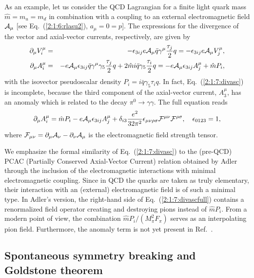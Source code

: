 \documentclass[twoside,12pt]{article}
\begin{document}
   As an example, let us consider the QCD Lagrangian for a finite light quark
mass $\hat{m}=m_u=m_d$ in combination with a coupling to an external
electromagnetic field ${\cal A}_\mu$ [see Eq.\ (\ref{2:1:6:rlasu2}),
$a_\mu=0=p$].
   The expressions for the divergence of the vector and
axial-vector currents, respectively, are given by \cite{Fuchs:2003vw}
\begin{eqnarray}
\label{2:1:7:divvsc}
\partial_\mu V^\mu_i&=&-\epsilon_{3ij}e{\cal A}_\mu \bar{q}\gamma^\mu
\frac{\tau_j}{2}q=-\epsilon_{3ij}e{\cal A}_\mu V^\mu_j,\\
\label{2:1:7:divasc}
\partial_\mu A^\mu_i
&=&-e {\cal A}_\mu \epsilon_{3ij} \bar{q}\gamma^\mu
\gamma_5 \frac{\tau_j}{2} q+2\hat m i\bar{q}\gamma_5 \frac{\tau_i}{2}q
=-e {\cal A}_\mu \epsilon_{3ij} A^\mu_j+\hat m P_i,
\end{eqnarray}
with the isovector pseudoscalar density
$P_i=i\bar{q}\gamma_5 \tau_i q$.
   In fact, Eq.\ (\ref{2:1:7:divasc}) is incomplete, because the third
component of the axial-vector current, $A^\mu_3$, has an anomaly
which is related to the decay $\pi^0\to\gamma\gamma$.
   The full equation reads
\begin{equation}
\label{2:1:7:divascfull}
\partial_\mu A^\mu_i
=\hat m P_i-e {\cal A}_\mu \epsilon_{3ij} A^\mu_j
+\delta_{i3}
\frac{e^2}{32\pi^2}\epsilon_{\mu\nu\rho\sigma}{\cal F}^{\mu\nu}
{\cal F}^{\rho\sigma}, \quad \epsilon_{0123}=1,
\end{equation}
where ${\cal F}_{\mu\nu}=\partial_\mu{\cal A}_\nu-\partial_\nu{\cal A}_\mu$ is
the electromagnetic field strength tensor.

   We emphasize the formal similarity of Eq.\ (\ref{2:1:7:divasc}) to the
(pre-QCD) PCAC (Partially Conserved Axial-Vector Current) relation
obtained by Adler \cite{Adler:1965:5:5} through the inclusion of the
electromagnetic interactions with minimal electromagnetic coupling.
  Since in QCD the quarks are taken as truly elementary, their interaction
with an (external) electromagnetic field is of such a minimal type.
   In Adler's version, the right-hand side of Eq.\ (\ref{2:1:7:divascfull})
contains a renormalized field operator creating and destroying pions instead of
$\hat m P_i$.
   From a modern point of view, the combination $\hat m P_i/(M_\pi^2 F_\pi)$
serves as an interpolating pion field.
    Furthermore, the anomaly term is not yet present in Ref.\
\cite{Adler:1965:5:5}.


\subsection{Spontaneous symmetry breaking and Goldstone theorem}
\label{sec_ssbqcd}
\end{document}
